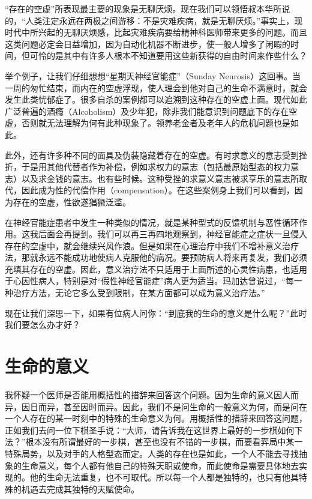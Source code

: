 \documentclass[11pt,oneside]{book}
\begin{document}
\begin{common-format}
“存在的空虚”所表现最主要的现象是无聊厌烦。现在我们可以领悟叔本华所说的，“人类注定永远在两极之间游移：不是灾难疾病，就是无聊厌烦。”事实上，现时代中所兴起的无聊厌烦感，比起灾难疾病要给精神科医师带来更多的问题。而且这类问题必定会日益增加，因为自动化机器不断进步，使一般人增多了闲暇的时间，但可怜的是其中有许多人根本不知道要用这些新获得的自由时间来作些什么？

举个例子，让我们仔细想想“星期天神经官能症”（Sunday Neurosis）这回事。当一周的匆忙结束，而内在的空虚浮现，使人理会到他对自己的生命不满意时，就会发生此类忧郁症了。很多自杀的案例都可以追溯到这种存在的空虚上面。现代如此广泛普遍的酒瘾（Alcoholism）及少年犯，除非我们能意识到问题底下的存在空虚，否则就无法理解为何有此种现象了。领养老金者及老年人的危机问题也是如此。

此外，还有许多种不同的面具及伪装隐藏着存在的空虚。有时求意义的意志受到挫折，于是用其他代替者作为补偿，例如求权力的意志（包括最原始型态的权力意志）以及求金钱的意志。也有些时候。这种受挫的求意义意志被求享乐的意志所取代，因此成为性的代偿作用（compensation）。在这些案例身上我们可以看到，因为存在的空虚，性欲遂猖獗泛滥。

在神经官能症患者中发生一种类似的情况，就是某种型式的反馈机制与恶性循环作用。这我后面会再提到。我们可以再三再四地观察到，神经官能症之症状一旦侵入存在的空虚中，就会继续兴风作浪。但是如果在心理治疗中我们不增补意义治疗法，那就永远不能成功地使病人克服他的病况。要预防病人将来再复发，我们必须充填其存在的空虚。因此，意义治疗法不只适用于上面所述的心灵性病患，也适用于心因性病人，特别是对“假性神经官能症”病人更为适当。玛加达曾说过，“每一种治疗方法，无论它多么受到限制，在某方面都可以成为意义治疗法。”

现在让我们深思一下，如果有位病人问你：“到底我的生命的意义是什么呢？”此时我们要怎么办才好？


\section{生命的意义}
我怀疑一个医师是否能用概括性的措辞来回答这个问题。因为生命的意义因人而异，因日而异，甚至因时而异。因此，我们不是问生命的一般意义为何，而是问在一个人存在的某一时刻中的特殊的生命意义为何。用概括性的措辞来回答这问题，正如我们去问一位下棋圣手说：“大师，请告诉我在这世界上最好的一步棋如何下法？”根本没有所谓最好的一步棋，甚至也没有不错的一步棋，而要看弈局中某一特殊局势，以及对手的人格型态而定。人类的存在也是如此，一个人不能去寻找抽象的生命意义，每个人都有他自己的特殊天职或使命，而此使命是需要具体地去实现的。他的生命无法重复，也不可取代。所以每一个人都是独特的，也只有他具特殊的机遇去完成其独特的天赋使命。


\end{common-format}
\end{document}
